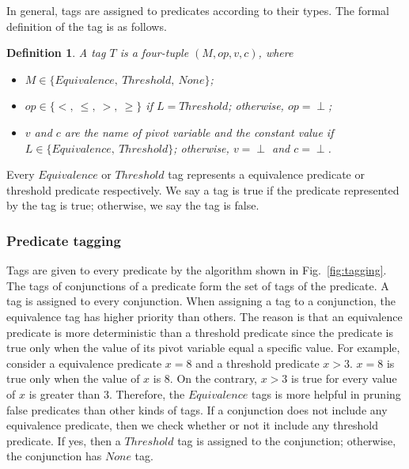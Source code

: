 \documentclass[preprint]{sigplanconf}
\newtheorem{definition}{Definition}
\begin{document}
In general, tags are assigned to predicates according to their types. The 
formal definition of the tag is as follows. 
\begin{definition}
   A tag $T$ is a four-tuple $(M, op, v, c)$, where  
   \begin{itemize}
      \item $M \in \{Equivalence,\ Threshold,\ None\}$;
      \item $op \in \{<,\ \le,\ >,\ \ge\}$ if $L = Threshold$; otherwise, 
         $op = \perp$;
      \item $v$ and $c$ are the name of pivot variable and the constant
         value if $L \in \{Equivalence,\ Threshold\}$; otherwise, $v = \perp$
         and $c = \perp$.
   \end{itemize}
\end{definition}
Every $Equivalence$ or $Threshold$ tag represents a equivalence predicate or
threshold predicate respectively. We say a tag is true if the predicate
represented by the tag is true; otherwise, we say the tag is false. 
\subsubsection{Predicate tagging}
Tags are given to every predicate by the algorithm shown in
Fig.~\ref{fig:tagging}. The tags of conjunctions of a predicate form the set of 
tags of the predicate. A tag is assigned to every conjunction. When assigning a 
tag to a conjunction, the equivalence tag has higher priority than others. The
reason is that an equivalence predicate is more deterministic than a threshold 
predicate since the predicate is true only when the value of its pivot variable 
equal a specific value. For example, consider a equivalence predicate $x = 8$
and a threshold predicate $x > 3$. $x = 8$ is true only when the value of $x$
is $8$. On the contrary, $x > 3$ is true for every value of $x$ is greater than
$3$. Therefore, the $Equivalence$ tags is more helpful in
pruning false predicates than other kinds of tags. If a conjunction does not 
include any equivalence predicate, then we check whether or not it 
include any threshold predicate. If yes, then a $Threshold$ tag is assigned 
to the conjunction; otherwise, the conjunction has $None$ tag. 
\end{document}
